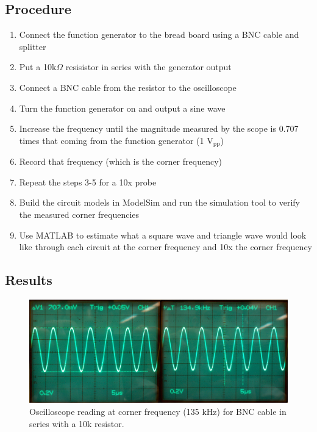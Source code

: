 \documentclass[12pt,letterpaper]{report}
\begin{document}
\subsection*{Procedure}
\begin{enumerate}
	\item Connect the function generator to the bread board using a BNC cable and splitter
	\item Put a 10k$\Omega$ resisistor in series with the generator output
	\item Connect a BNC cable from the resistor to the oscilloscope
	\item Turn the function generator on and output a sine wave
	\item Increase the frequency until the magnitude measured by the scope is 0.707 times that coming from the function generator (1 $\text{V}_{\text{pp}}$)
	\item Record that frequency (which is the corner frequency)
	\item Repeat the steps 3-5 for a 10x probe
	\item Build the circuit models in ModelSim and run the simulation tool to verify the measured corner frequencies
	\item Use MATLAB to estimate what a square wave and triangle wave would look like through each circuit at the corner frequency and 10x the corner frequency
\end{enumerate}

\subsection*{Results}

\begin{figure}
	\centering
	\includegraphics[width=\linewidth, keepaspectratio=true]{lab1_images/BNC_sine_corner.png} 
	\caption{Oscilloscope reading at corner frequency (135 kHz) for BNC cable in series with a 10k resistor. }
	\label{fig:bnc_corner}
\end{figure}
\end{document}
